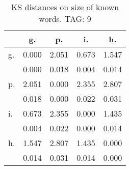\begin{table}[h!]
\begin{center}
\begin{tabular}{| l | c | c | c | c |}\hline
 & g. & p. & i. & h. \\\hline
g. & 0.000  & 2.051  & 0.673  & 1.547 \\\hline
 & 0.000  & 0.018  & 0.004  & 0.014 \\\hline
p. & 2.051  & 0.000  & 2.355  & 2.807 \\\hline
 & 0.018  & 0.000  & 0.022  & 0.031 \\\hline
i. & 0.673  & 2.355  & 0.000  & 1.435 \\\hline
 & 0.004  & 0.022  & 0.000  & 0.014 \\\hline
h. & 1.547  & 2.807  & 1.435  & 0.000 \\\hline
 & 0.014  & 0.031  & 0.014  & 0.000 \\\hline
\end{tabular}
\caption{KS distances on size of known words. TAG: 9}
\end{center}
\end{table}